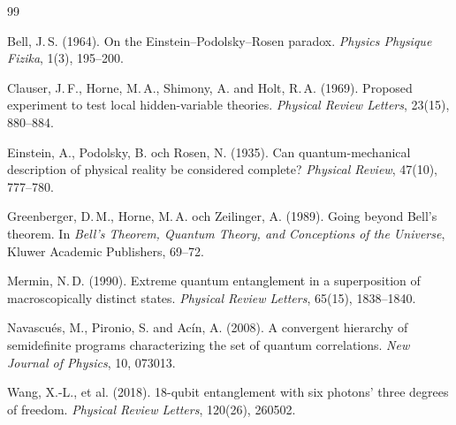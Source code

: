 \documentclass[12pt,a4paper]{article}
\theoremstyle{plain}
\theoremstyle{definition}
\theoremstyle{remark}
\begin{document}
\begin{thebibliography}{99}

Bell, J.\,S. (1964).
On the Einstein--Podolsky--Rosen paradox.
\emph{Physics Physique Fizika}, 1(3), 195--200.

Clauser, J.\,F., Horne, M.\,A., Shimony, A. and Holt, R.\,A. (1969).
Proposed experiment to test local hidden-variable theories.
\emph{Physical Review Letters}, 23(15), 880--884.

Einstein, A., Podolsky, B. och Rosen, N. (1935).
Can quantum-mechanical description of physical reality be considered complete?
\emph{Physical Review}, 47(10), 777--780.

Greenberger, D.\,M., Horne, M.\,A. och Zeilinger, A. (1989).
Going beyond Bell's theorem.
In \emph{Bell's Theorem, Quantum Theory, and Conceptions of the Universe},
Kluwer Academic Publishers, 69--72.

Mermin, N.\,D. (1990).
Extreme quantum entanglement in a superposition of macroscopically distinct states.
\emph{Physical Review Letters}, 65(15), 1838--1840.

Navascu\'{e}s, M., Pironio, S. and Ac\'{i}n, A. (2008).
A convergent hierarchy of semidefinite programs characterizing the
set of quantum correlations.
\emph{New Journal of Physics}, 10, 073013.

Wang, X.-L., et al. (2018).
18-qubit entanglement with six photons' three degrees of freedom.
\emph{Physical Review Letters}, 120(26), 260502.

\end{thebibliography}
\end{document}
